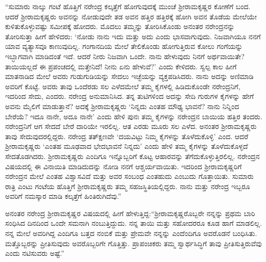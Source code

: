 “ಸುಮಾರು ನಾಲ್ಕು ಗಂಟೆ ಹೊತ್ತಿಗೆ ನರೇಂದ್ರ ಕಲ್ಕತ್ತೆಗೆ ಹೋಗುವುದಕ್ಕೆ ಮುಂಚೆ ಶ‍್ರೀರಾಮಕೃಷ್ಣರ ಕೋಣೆಗೆ ಬಂದ. ಆದರೆ ಶ‍್ರೀರಾಮಕೃಷ್ಣರು ಅವನನ್ನು ನೋಡುವುದೇ ತಡ ಅವನ ಹತ್ತಿರ ಹತ್ತಿರಕ್ಕೆ ಹೋಗಿ ಅವನ ತೊಡೆಯ ಮೇಲೆಯೇ ಕುಳಿತುಕೊಳ್ಳುವಷ್ಟು ಸಮೀಪಕ್ಕೆ ಹೋದರು. ಮೊದಲು ತಮ್ಮನ್ನು ತೋರಿಸಿಕೊಂಡು ಅನಂತರ ನರೇಂದ್ರನನ್ನು ತೋರಿಸುತ್ತಾ ಹೀಗೆ ಹೇಳಿದರು: ‘ನೋಡು ನಾನು ಇದು ಮತ್ತು ಅದು ಎಂದು ಭಾಸವಾಗುವುದು. ನಿಜವಾಗಿಯೂ ನನಗೆ ಯಾವ ವ್ಯತ್ಯಾಸವೂ ಕಾಣುವುದಿಲ್ಲ. ಗಂಗಾನದಿಯ ಮೇಲೆ ತೇಲಿಕೊಂಡು ಹೋಗುತ್ತಿರುವ ಕೋಲು ಗಂಗೆಯನ್ನು ಇಬ್ಭಾಗವಾಗಿ ಮಾಡಿದಂತೆ ಇದೆ. ಆದರೆ ನೀರು ನಿಜವಾಗಿ ಒಂದೇ. ನಾನು ಹೇಳುವುದು ನಿನಗೆ ಅರ್ಥವಾಯಿತೇ? ತಾಯಿಯಲ್ಲದೆ ಈ ಪ್ರಪಂಚದಲ್ಲಿ ಮತ್ತೇನಿದೆ! ನೀನು ಏನು ಹೇಳುವೆ?’ ಎಂದು ಕೇಳಿದರು. ಸ್ವಲ್ಪ ಕಾಲ ಹೀಗೆ ಮಾತನಾಡಿದ ಮೇಲೆ ಅವರು ಗುಡುಗುಡಿಯನ್ನು ಸೇದಲು ಇಚ್ಛೆಯನ್ನು ವ್ಯಕ್ತಪಡಿಸಿದರು. ನಾನು ಅದನ್ನು ಅಣಿಮಾಡಿ ಅವರಿಗೆ ಕೊಟ್ಟೆ. ಅವರು ತಾವು ಒಂದೆರಡು ಸಲ ಎಳೆದಮೇಲೆ ತಮ್ಮ ಕೈಗಳಲ್ಲಿ ಹಿಡಿದುಕೊಂಡೇ ನರೇಂದ್ರನಿಗೆ, ಇದರಿಂದ ಸೇದು, ಎಂದರು. ನರೇಂದ್ರ ಅನುಮಾನಿಸಿದ. ತನ್ನ ತುಟಿಗಳಿಂದ ಅದನ್ನು ಸೇದಿ ಗುರುಗಳ ಕೈಗಳನ್ನು ಹೇಗೆ ಅವನು ಮೈಲಿಗೆ ಮಾಡುತ್ತಾನೆ? ಅದಕ್ಕೆ ಶ‍್ರೀರಾಮಕೃಷ್ಣರು ‘ನಿನ್ನದು ಎಂತಹ ಮೌಢ್ಯ ಭಾವನೆ? ನಾನು ನಿನ್ನಿಂದ ಬೇರೆಯೆ? ಇದೂ ನಾನೇ, ಅದೂ ನಾನೇ’ ಎಂದು ಹೇಳಿ ಪುನಃ ತಮ್ಮ ಕೈಗಳನ್ನು ನರೇಂದ್ರನ ಬಾಯಿಯ ಹತ್ತಿರ ತಂದರು. ನರೇಂದ್ರನಿಗೆ ಆಗ ಸೇದದೆ ಬೇರೆ ದಾರಿಯೇ ಇರಲಿಲ್ಲ. ಆತ ಎರಡು ಮೂರು ಸಲ ಎಳೆದ. ಅನಂತರ ಶ‍್ರೀರಾಮಕೃಷ್ಣರು ತಾವು ಸೇದುವುದರಲ್ಲಿದ್ದರು. ನರೇಂದ್ರ ತತ್‍ಕ್ಷಣವೇ ‘ದಯವಿಟ್ಟು ನಿಮ್ಮ ಕೈಗಳನ್ನು ತೊಳೆದುಕೊಳ್ಳಿ’ ಎಂದ. ಆದರೆ ಶ‍್ರೀರಾಮಕೃಷ್ಣರು ‘ಎಂತಹ ಮೂಢವಾದ ಭೇದಭಾವನೆ ನಿನ್ನದು’ ಎಂದು ಹೇಳಿ ತಮ್ಮ ಕೈಗಳನ್ನು ತೊಳೆದುಕೊಳ್ಳದೆ ಸೇದತೊಡಗಿದರು. ಶ‍್ರೀರಾಮಕೃಷ್ಣರು ಎಂದಿಗೂ ಇನ್ನೊಬ್ಬರಿಗೆ ಕೊಟ್ಟ ಆಹಾರವನ್ನು ತೆಗೆದುಕೊಳ್ಳುತ್ತಿರಲಿಲ್ಲ. ನರೇಂದ್ರನ ವಿಷಯದಲ್ಲಿ ಈ ವಿನಾಯಿತಿ ಮಾಡಿದುದನ್ನು ನೋಡಿ ನನಗೆ ಆಶ್ಚರ್ಯವಾಯಿತು. ಇದರಿಂದ ಶ‍್ರೀರಾಮಕೃಷ್ಣರಿಗೆ ನರೇಂದ್ರನ ಮೇಲೆ ಎಂತಹ ವಿಶ್ವಾಸವಿದೆ ಮತ್ತು ಅವರ ಸಂಬಂಧ ಎಂತಹುದು ಎಂಬುದು ಗೊತ್ತಾಯಿತು. ಸುಮಾರು ರಾತ್ರಿ ಎಂಟು ಗಂಟೆಯ ಹೊತ್ತಿಗೆ ಶ‍್ರೀರಾಮಕೃಷ್ಣರು ತಮ್ಮ ಸಹಜಸ್ಥಿತಿಯಲ್ಲಿದ್ದರು. ನಾನು ಮತ್ತು ನರೇಂದ್ರ ಇಬ್ಬರೂ ಅವರಿಗೆ ನಮಸ್ಕಾರ ಮಾಡಿ ಕಲ್ಕತ್ತೆಗೆ ಹಿಂತಿರುಗಿದೆವು.”

ಅನಂತರ ನರೇಂದ್ರ ಶ‍್ರೀರಾಮಕೃಷ್ಣರ ವಿಷಯದಲ್ಲಿ ಹೀಗೆ ಹೇಳುತ್ತಿದ್ದ:\break “ಶ‍್ರೀರಾಮಕೃಷ್ಣರೊಬ್ಬರೇ ನನ್ನನ್ನು ಪ್ರಥಮ ಬಾರಿ ಸಂಧಿಸಿದ ದಿನದಿಂದ ಒಂದೇ ಸಮನಾಗಿ ನಂಬುತ್ತಿದ್ದುದು. ನನ್ನ ತಾಯಿ ಮತ್ತು ಸಹೋದರರೂ ಕೂಡ ಹಾಗೆ ಮಾಡಲಿಲ್ಲ. ನನ್ನ ಮೇಲೆ ಅವರಿಗಿದ್ದ ಎಂದಿಗೂ ಬತ್ತದ ನಂಬಿಕೆ ಮತ್ತು ಪ್ರೇಮವೇ ನನ್ನನ್ನು ಎಂದೆಂದಿಗೂ ಅವರೊಡನೆ ಬಂಧಿಸಿತು. ಮತ್ತೊಬ್ಬರನ್ನು ಪ್ರೀತಿಸುವುದು ಅವರೊಬ್ಬರಿಗೇ ಗೊತ್ತಿತ್ತು. ಪ್ರಾಪಂಚಿಕರು ತಮ್ಮ ಸ್ವಾರ್ಥಸಿದ್ಧಿಗೆ ತಾವು ಪ್ರೀತಿಸುತ್ತಿರುವೆವು ಎಂದು ನಟಿಸುವರು ಅಷ್ಟೆ.”

